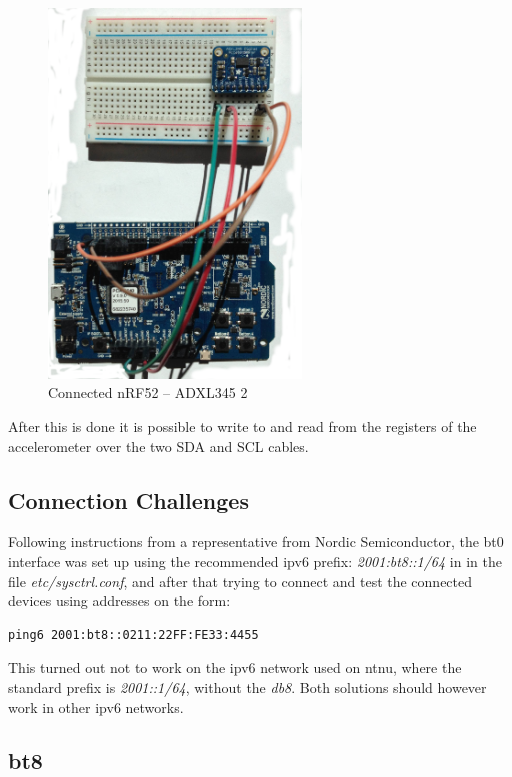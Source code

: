 \begin{figure}[ht]
    \centering
    \includegraphics[width=0.6\textwidth]{connectionADXL-nrf3.png}    
    \caption{Connected nRF52 -- ADXL345 2}
    \label{fig:nrf-adxl345}
\end{figure}

After this is done it is possible to write to and read from the registers of the accelerometer over the two SDA and SCL cables. 


\subsection{Connection Challenges}

Following instructions from a representative from Nordic Semiconductor, the bt0 interface was set up using the recommended \gls{ipv6} prefix: \textit{2001:bt8::1/64} in in the file \textit{etc/sysctrl.conf}, and after that trying to connect and test the connected devices using addresses on the form: 

\begin{verbatim}
ping6 2001:bt8::0211:22FF:FE33:4455
\end{verbatim}

This turned out not to work on the \gls{ipv6} network used on \gls{ntnu}, where the standard prefix is \textit{2001::1/64}, without the \textit{db8}. Both solutions should however work in other \gls{ipv6} networks. 

\subsection{bt8}

